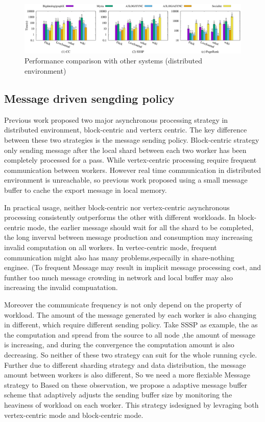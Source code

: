 \begin{figure}[!t]
	\vspace{-0.1in}
	\hspace{-0.28in}
	\includegraphics[width=7.2in]{figuration/compare.eps}
	\vspace{-0.1in}
	\caption{Performance comparison with other systems (distributed environment)}
	\label{fig:dist-result}
\end{figure}
{\color{red}
	
	\subsection{Message driven sengding policy}
	
	Previous work proposed two major asynchronous processing strategy in distributed environment, block-centric and verterx centric. The key difference between these two strategies is the message sending policy. Block-centric strategy only sending message after the local shard between each two worker has been completely processed for a pass. While vertex-centric processing require  frequent communication between workers. However real time communication in distributed environment is unreachable, so previous work proposed\cite{} using a small message buffer to cache the export message in local memory.
	
In practical usage, neither block-centric nor vertex-centric asynchronous processing consistently outperforms the other with different workloads. In block-centric mode, the earlier message should wait for all the shard to be completed, the long inverval between message production and consumption may increasing invalid computation on all workers. In vertec-centric mode, frequent communication might also has many problems,especailly in share-nothing enginee. (To frequent Message may result in implicit message processing cost, and  funther too much message crowding in network and local buffer may also increasing the invalid compuatation. 
	
	Moreover the communicate frequency is not only depend on the property of workload. The amount of the message generated by each worker is also changing in different, which require different sending policy. Take SSSP as example, the as the computation and spread from the source to all node ,the amount of message is increasing, and during the convergence the computation amount is also decreasing. So neither of these two strategy can suit for the whole running cycle.
	Further due to different sharding strategy and data distribution, the message amount between workers is also different, So we need a more flexiable Message strategy to  
	Based on these observation, we propose a adaptive message buffer scheme that adaptively adjusts the sending buffer size by monitoring the heaviness of workload on each worker. This strategy isdesigned by levraging both vertex-centric mode and block-centric mode. 
	
}
